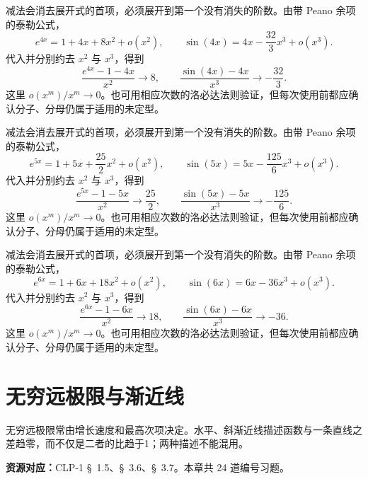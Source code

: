\documentclass[12pt,fontset=fandol]{ctexart}
\begin{document}
\begin{solve}\label{ans:c3q23}
减法会消去展开式的首项，必须展开到第一个没有消失的阶数。由带 Peano 余项的泰勒公式，
\[
e^{4x}=1+4x+8x^2+o(x^2),\qquad\sin(4x)=4x-\frac{32}{3}x^3+o(x^3).
\]
代入并分别约去 $x^2$ 与 $x^3$，得到
\[
\frac{e^{4x}-1-4x}{x^2}\to 8,\qquad\frac{\sin(4x)-4x}{x^3}\to-\frac{32}{3}.
\]
这里 $o(x^m)/x^m\to0$。也可用相应次数的洛必达法则验证，但每次使用前都应确认分子、分母仍属于适用的未定型。
\end{solve}

\begin{solve}\label{ans:c3q24}
减法会消去展开式的首项，必须展开到第一个没有消失的阶数。由带 Peano 余项的泰勒公式，
\[
e^{5x}=1+5x+\frac{25}{2}x^2+o(x^2),\qquad\sin(5x)=5x-\frac{125}{6}x^3+o(x^3).
\]
代入并分别约去 $x^2$ 与 $x^3$，得到
\[
\frac{e^{5x}-1-5x}{x^2}\to \frac{25}{2},\qquad\frac{\sin(5x)-5x}{x^3}\to-\frac{125}{6}.
\]
这里 $o(x^m)/x^m\to0$。也可用相应次数的洛必达法则验证，但每次使用前都应确认分子、分母仍属于适用的未定型。
\end{solve}

\begin{solve}\label{ans:c3q25}
减法会消去展开式的首项，必须展开到第一个没有消失的阶数。由带 Peano 余项的泰勒公式，
\[
e^{6x}=1+6x+18x^2+o(x^2),\qquad\sin(6x)=6x-36x^3+o(x^3).
\]
代入并分别约去 $x^2$ 与 $x^3$，得到
\[
\frac{e^{6x}-1-6x}{x^2}\to 18,\qquad\frac{\sin(6x)-6x}{x^3}\to-36.
\]
这里 $o(x^m)/x^m\to0$。也可用相应次数的洛必达法则验证，但每次使用前都应确认分子、分母仍属于适用的未定型。
\end{solve}

\clearpage
\section{无穷远极限与渐近线}\label{sec:ch4}
无穷远极限常由增长速度和最高次项决定。水平、斜渐近线描述函数与一条直线之差趋零，而不仅是二者的比趋于1；两种描述不能混用。

\textbf{资源对应：}CLP-1 \S~1.5、\S~3.6、\S~3.7。本章共 24 道编号习题。
\end{document}
